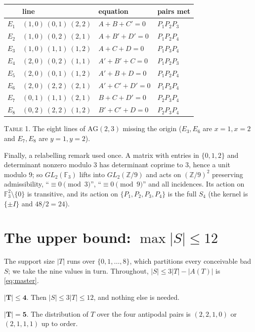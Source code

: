 \documentclass[11pt]{amsart}
\newcommand{\ZZ}{\mathbb Z}
\newcommand{\FF}{\mathbb F}
\begin{document}
\begin{center}
\renewcommand{\arraystretch}{1.15}
\begin{tabular}{llll}
\hline
 & line & equation & pairs met \\
\hline
$E_1$ & $(1,0)\ (0,1)\ (2,2)$ & $A+B+C'=0$   & $P_1P_2P_3$\\
$E_2$ & $(1,0)\ (0,2)\ (2,1)$ & $A+B'+D'=0$  & $P_1P_2P_4$\\
$E_3$ & $(1,0)\ (1,1)\ (1,2)$ & $A+C+D=0$    & $P_1P_3P_4$\\
$E_4$ & $(2,0)\ (0,2)\ (1,1)$ & $A'+B'+C=0$  & $P_1P_2P_3$\\
$E_5$ & $(2,0)\ (0,1)\ (1,2)$ & $A'+B+D=0$   & $P_1P_2P_4$\\
$E_6$ & $(2,0)\ (2,2)\ (2,1)$ & $A'+C'+D'=0$ & $P_1P_3P_4$\\
$E_7$ & $(0,1)\ (1,1)\ (2,1)$ & $B+C+D'=0$   & $P_2P_3P_4$\\
$E_8$ & $(0,2)\ (2,2)\ (1,2)$ & $B'+C'+D=0$  & $P_2P_3P_4$\\
\hline
\end{tabular}

\smallskip
\textsc{Table 1.} The eight lines of $\mathrm{AG}(2,3)$ missing the origin
($E_3,E_6$ are $x=1,x=2$ and $E_7,E_8$ are $y=1,y=2$).
\end{center}

Finally, a relabelling remark used once. A matrix with entries in $\{0,1,2\}$
and determinant nonzero modulo $3$ has determinant coprime to $3$, hence a unit
modulo $9$; so $GL_2(\FF_3)$ lifts into $GL_2(\ZZ/9)$ and acts on $(\ZZ/9)^2$
preserving admissibility, ``$\equiv0\pmod3$'', ``$\equiv0\pmod9$'' and all
incidences. Its action on $\FF_3^2\setminus\{0\}$ is transitive, and its action
on $\{P_1,P_2,P_3,P_4\}$ is the full $S_4$ (the kernel is $\{\pm I\}$ and
$48/2=24$).

\section{The upper bound: $\max|S|\le12$}\label{sec:cases}

The support size $|T|$ runs over $\{0,1,\dots,8\}$, which partitions every
conceivable bad $S$; we take the nine values in turn. Throughout, $|S|\le3|T|-|A(T)|$
is \eqref{eq:master}.

\smallskip
\noindent$\boldsymbol{|T|\le4}$. Then $|S|\le3|T|\le12$, and nothing else is
needed.

\smallskip
\noindent$\boldsymbol{|T|=5}$. The distribution of $T$ over the four antipodal
pairs is $(2,2,1,0)$ or $(2,1,1,1)$ up to order.
\end{document}
